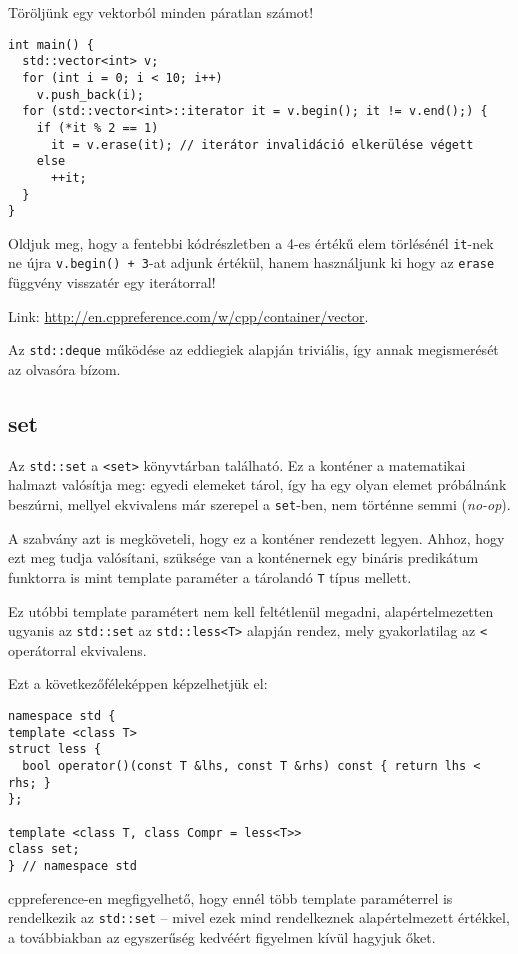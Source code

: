 \documentclass[../cpp_book/cpp_book.tex]{subfiles}
\begin{document}
	\smallskip
	Töröljünk egy vektorból minden páratlan számot!
	\begin{lstlisting}
int main() {
  std::vector<int> v;
  for (int i = 0; i < 10; i++)
    v.push_back(i);
  for (std::vector<int>::iterator it = v.begin(); it != v.end();) {
    if (*it % 2 == 1)
      it = v.erase(it); // iterátor invalidáció elkerülése végett
    else
      ++it;
  }
}
	\end{lstlisting}
	\begin{note}
		Oldjuk meg, hogy a fentebbi kódrészletben a 4-es értékű elem törlésénél \texttt{it}-nek ne újra \texttt{v.begin() + 3}-at adjunk értékül, hanem használjunk ki hogy az \texttt{erase} függvény visszatér egy iterátorral!
	\end{note}
	Link: \url{http://en.cppreference.com/w/cpp/container/vector}.
	
	\begin{note}
		Az \texttt{std::deque} működése az eddiegiek alapján triviális, így annak megismerését az olvasóra bízom.
	\end{note}
	\subsection{set}
	
	Az \texttt{std::set} a \texttt{<set>} könyvtárban található. Ez a konténer a matematikai halmazt valósítja meg: egyedi elemeket tárol, így ha egy olyan elemet próbálnánk beszúrni, mellyel ekvivalens már szerepel a \texttt{set}-ben, nem történne semmi (\textit{no-op}). 
	
	A szabvány azt is megköveteli, hogy ez a konténer rendezett legyen. Ahhoz, hogy ezt meg tudja valósítani, szüksége van a konténernek egy bináris predikátum funktorra is mint template paraméter a tárolandó \texttt{T} típus mellett.
	\smallskip
	
	Ez utóbbi template paramétert nem kell feltétlenül megadni, alapértelmezetten ugyanis az \texttt{std::set} az \texttt{std::less<T>} alapján rendez, mely gyakorlatilag az \texttt{<} operátorral ekvivalens.
	\smallskip
	
	Ezt a következőféleképpen képzelhetjük el:
	\begin{lstlisting}
namespace std {
template <class T>
struct less {
  bool operator()(const T &lhs, const T &rhs) const { return lhs < rhs; }
};

template <class T, class Compr = less<T>>
class set;
} // namespace std
	\end{lstlisting}
	\begin{note}
		cppreference-en megfigyelhető, hogy ennél több template paraméterrel is rendelkezik az \texttt{std::set} -- mivel ezek mind rendelkeznek alapértelmezett értékkel, a továbbiakban az egyszerűség kedvéért figyelmen kívül hagyjuk őket.
	\end{note}
	
\end{document}
